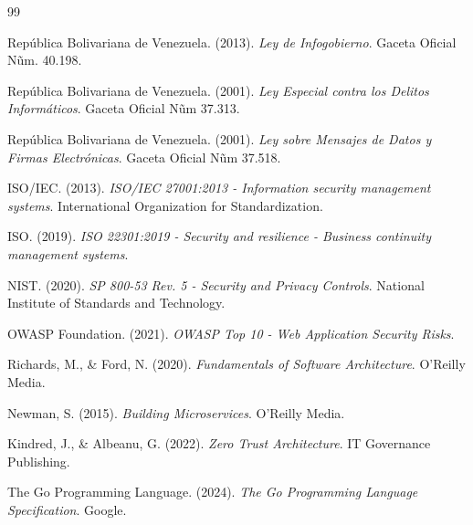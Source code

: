 \renewcommand{\bibname}{Referencias Bibliogr\'aficas}

\begin{thebibliography}{99}


\item Rep\'ublica Bolivariana de Venezuela. (2013). \textit{Ley de Infogobierno}. Gaceta Oficial N\~{u}m. 40.198.

\item Rep\'ublica Bolivariana de Venezuela. (2001). \textit{Ley Especial contra los Delitos Inform\'aticos}. Gaceta Oficial N\~{u}m 37.313.

\item Rep\'ublica Bolivariana de Venezuela. (2001). \textit{Ley sobre Mensajes de Datos y Firmas Electrónicas}. Gaceta Oficial N\~{u}m 37.518.

\item ISO/IEC. (2013). \textit{ISO/IEC 27001:2013 - Information security management systems}. International Organization for Standardization.

\item ISO. (2019). \textit{ISO 22301:2019 - Security and resilience - Business continuity management systems}.

\item NIST. (2020). \textit{SP 800-53 Rev. 5 - Security and Privacy Controls}. National Institute of Standards and Technology.

\item OWASP Foundation. (2021). \textit{OWASP Top 10 - Web Application Security Risks}.

\item Richards, M., \& Ford, N. (2020). \textit{Fundamentals of Software Architecture}. O'Reilly Media.

\item Newman, S. (2015). \textit{Building Microservices}. O'Reilly Media.

\item Kindred, J., \& Albeanu, G. (2022). \textit{Zero Trust Architecture}. IT Governance Publishing.

\item The Go Programming Language. (2024). \textit{The Go Programming Language Specification}. Google.


\end{thebibliography}
